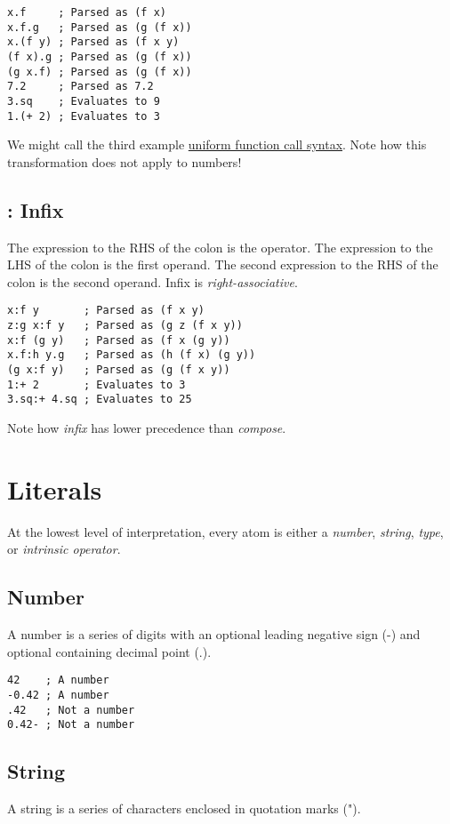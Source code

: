 \documentclass[numbers=noenddot]{scrbook}
\begin{document}
\begin{verbatim}
x.f     ; Parsed as (f x)
x.f.g   ; Parsed as (g (f x))
x.(f y) ; Parsed as (f x y)
(f x).g ; Parsed as (g (f x))
(g x.f) ; Parsed as (g (f x))
7.2     ; Parsed as 7.2
3.sq    ; Evaluates to 9
1.(+ 2) ; Evaluates to 3
\end{verbatim}

We might call the third example \href{http://www.drdobbs.com/cpp/uniform-function-call-syntax/232700394}{uniform function call syntax}.
Note how this transformation does not apply to numbers!

\section{: Infix}
The expression to the RHS of the colon is the operator.
The expression to the LHS of the colon is the first operand.
The second expression to the RHS of the colon is the second operand.
Infix is \emph{right-associative}.

\begin{verbatim}
x:f y       ; Parsed as (f x y)
z:g x:f y   ; Parsed as (g z (f x y))
x:f (g y)   ; Parsed as (f x (g y))
x.f:h y.g   ; Parsed as (h (f x) (g y))
(g x:f y)   ; Parsed as (g (f x y))
1:+ 2       ; Evaluates to 3
3.sq:+ 4.sq ; Evaluates to 25
\end{verbatim}

Note how \emph{infix} has lower precedence than \emph{compose}.

\chapter{Literals}
At the lowest level of interpretation, every atom is either a \emph{number}, \emph{string}, \emph{type}, or \emph{intrinsic operator}.

\section{Number}
A number is a series of digits with an optional leading negative sign (-) and optional containing decimal point (.).

\begin{verbatim}
42    ; A number
-0.42 ; A number
.42   ; Not a number
0.42- ; Not a number
\end{verbatim}

\section{String}
A string is a series of characters enclosed in quotation marks (").
\end{document}
